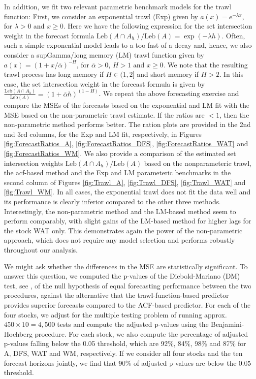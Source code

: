 \documentclass{article}
\theoremstyle{plain}
\theoremstyle{definition}
\theoremstyle{remark}
\newcommand{\Leb}{\ensuremath{\mathrm{Leb}}}
\begin{document}
In addition, we fit two relevant  parametric benchmark models for the trawl function: First, we consider an exponential trawl (Exp) given by  $a(x)=e^{-\lambda x}$, for $\lambda>0$ and $x\geq 0$. Here we have
the following expression for the set intersection weight in the forecast formula
$\Leb(A \cap A_h)/\Leb(A)=\exp(-\lambda h)$.
Often, such a simple exponential model leads to a too fast of a decay and, hence, we also consider a supGamma/long memory (LM) trawl function given by $a(x)=(1+x/\overline{\alpha})^{-H}$, for $\overline{\alpha}>0$, $H>1$ and $x\geq 0$. We note that the resulting trawl process has long memory if $H\in(1,2]$ and  short memory if $H>2$.
In this case, the set intersection weight in the forecast formula is given by 
$\frac{\Leb(A \cap A_h)}{\Leb(A)}=(1+\overline{\alpha} h)^{(1-H)}$.
We repeat the above forecasting exercise and compare the MSEs of the forecasts based on the  exponential and LM fit with the MSE based on the non-parametric trawl estimate. If the ratios are $<1$, then the non-parametric method performs better. The ration plots are provided in the 2nd and 3rd columns, for the Exp and LM fit, respectively, in Figures \ref{fig:ForecastRatios_A}, \ref{fig:ForecastRatios_DFS}, \ref{fig:ForecastRatios_WAT} and \ref{fig:ForecastRatios_WM}.
We also provide a comparison of the estimated set intersection weights $\Leb(A \cap A_h)/\Leb(A)$ based on the nonparameteric trawl, the acf-based method and the Exp and LM parameteric benchmarks in the second column of Figures \ref{fig:Trawl_A},
\ref{fig:Trawl_DFS},
\ref{fig:Trawl_WAT}
and
\ref{fig:Trawl_WM}.
In all cases, the exponential trawl does not fit the data well and its performance is clearly inferior compared to the other three methods. Interestingly, the non-parametric method and the LM-based method seem to perform comparably, with slight gains of the LM-based method for higher lags for the stock WAT only.
This demonstrates again the power of the non-parametric approach, which does not require any model selection and performs robustly throughout our analysis. 


We might ask whether the differences in the MSE are statistically significant. To answer this question, we computed the p-values  of the Diebold-Mariano (DM) test, see \cite{DM1995}, of the null hypothesis of equal forecasting
performance between the two procedures, against the alternative that the 
trawl-function-based predictor provides superior forecasts compared to the ACF-based predictor.
For each of the four stocks, we adjust for the multiple testing problem of running approx.~$450\times10=4,500$ tests and compute the adjusted p-values using the Benjamini-Hochberg procedure. For each stock, we also compute the percentage of adjusted p-values falling below the 0.05 threshold, which are 92\%, 84\%, 98\% and 87\% for A, DFS, WAT and WM, respectively.
If we consider all four stocks and the ten forecast horizons jointly, we find that 90\% of adjusted p-values are below the 0.05 threshold.
\end{document}
